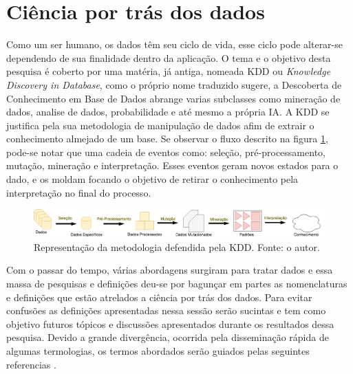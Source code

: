 \section{Ciência por trás dos dados}
Como um ser humano, os dados têm seu ciclo de vida, esse ciclo pode alterar-se dependendo de sua finalidade dentro da aplicação. O tema e o objetivo desta pesquisa é coberto por uma matéria, já antiga, nomeada KDD ou \textit{Knowledge Discovery in Database}, como o próprio nome traduzido sugere, a Descoberta de Conhecimento em Base de Dados abrange varias subclasses como mineração de dados, analise de dados, probabilidade e até mesmo a própria IA. A KDD se justifica pela sua metodologia de manipulação de dados afim de extrair o conhecimento almejado de um base. Se observar o fluxo descrito na figura \ref{fig:kdd}, pode-se notar que uma cadeia de eventos como: seleção, pré-processamento, mutação, mineração e interpretação. Esses eventos geram novos estados para o dado, e os moldam focando o objetivo de retirar o conhecimento pela interpretação no final do processo.

\begin{figure}
    \centering
    \includegraphics[width=.8\textwidth]{imagens/kdd.png}
    \caption{Representação da metodologia defendida pela KDD. Fonte: o autor.}
    \label{fig:kdd}
\end{figure}

Com o passar do tempo, várias abordagens surgiram para tratar dados e essa massa de pesquisas e definições deu-se por bagunçar em partes as nomenclaturas e definições que estão atrelados a ciência por trás dos dados. Para evitar confusões as definições apresentadas nessa sessão serão sucintas e tem como objetivo futuros tópicos e discussões apresentados durante os resultados dessa pesquisa. Devido a grande divergência, ocorrida pela disseminação rápida de algumas termologias, os termos abordados serão guiados pelas seguintes referencias \cite{laender2002brief, fayyad1996kdd, hand2007principles}.




